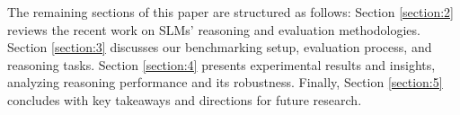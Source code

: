 The remaining sections of this paper are structured as follows: Section \ref{section:2} reviews the recent work on SLMs' reasoning and evaluation methodologies. Section \ref{section:3} discusses our benchmarking setup, evaluation process, and reasoning tasks. Section \ref{section:4} presents experimental results and insights, analyzing reasoning performance and its robustness. Finally, Section \ref{section:5} concludes with key takeaways and directions for future research.
